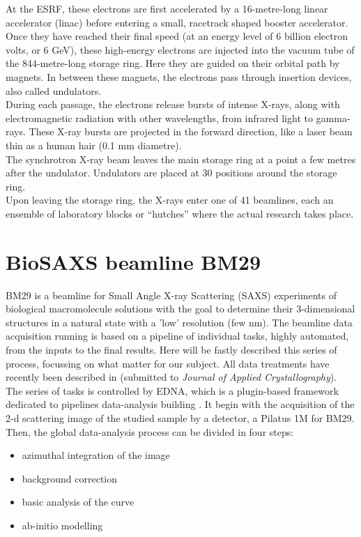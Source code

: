 \documentclass[a4paper, 11pt]{report}
\begin{document}
At the ESRF, these electrons are first accelerated by a 16-metre-long 
linear accelerator (linac) before entering a small, racetrack shaped 
booster accelerator. 
Once they have reached their final speed (at an energy level of 6 
billion electron volts, or 6 GeV), these high-energy electrons are 
injected into the vacuum tube of the 844-metre-long storage ring. 
Here they are guided on their orbital path by magnets. 
In between these magnets, the electrons pass through insertion 
devices, also called undulators.\\
During each passage, the electrons release bursts of intense X-rays, 
along with electromagnetic radiation with other wavelengths, from 
infrared light to gamma-rays. 
These X-ray bursts are projected in the forward direction, like a 
laser beam thin as a human hair (0.1 mm diametre).\\

The synchrotron X-ray beam leaves the main storage ring at a point a 
few metres after the undulator. 
Undulators are placed at 30 positions around the storage ring.\\

Upon leaving the storage ring, the X-rays enter one of 41 beamlines, 
each an ensemble of laboratory blocks or “hutches” where the actual 
research takes place. 


\section{BioSAXS beamline BM29}

BM29 \cite{BM29paper} is a beamline for Small Angle X-ray Scattering 
(SAXS) experiments of biological macromolecule solutions with the goal 
to determine their 3-dimensional structures in a natural state with a 
'low' resolution (few nm). 
The beamline data acquisition running is based on a pipeline of 
individual tasks, highly automated, from the inputs to the final 
results. 
Here will be fastly described this series of process, focussing on 
what matter for our subject.
All data treatments have recently been described in \cite{BM29news} 
(submitted to \textit{Journal of Applied Crystallography}).\\

The series of tasks is controlled by EDNA, which is a plugin-based 
framework dedicated to pipelines data-analysis building \cite{edna}. 
It begin with the acquisition of the 2-d scattering image of the 
studied sample by a detector, a Pilatus 1M for BM29. 
Then, the global data-analysis process can be divided in four steps: 
\begin{itemize}
 \item azimuthal integration of the image
 \item background correction
 \item basic analysis of the curve
 \item ab-initio modelling
\end{itemize}
\end{document}
